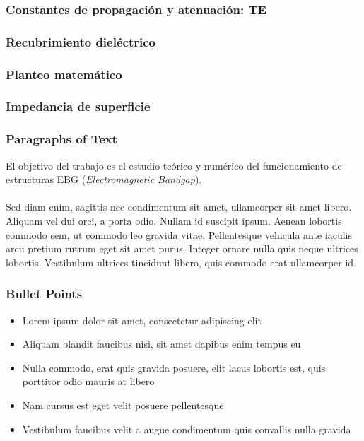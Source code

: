 \documentclass{beamer}
\begin{document}
			\begin{frame}
			\frametitle{Constantes de propagación y atenuación: TE}
			\end{frame}
		
		\subsubsection{Recubrimiento dieléctrico}
			
			\begin{frame}
			\frametitle{Planteo matemático}
			\end{frame}
			
			\begin{frame}
			\frametitle{Impedancia de superficie}
			\end{frame}
		

\begin{frame}
\frametitle{Paragraphs of Text}
El objetivo del trabajo es el estudio teórico y numérico del funcionamiento de estructuras EBG (\textit{Electromagnetic Bandgap}).\\~\\

Sed diam enim, sagittis nec condimentum sit amet, ullamcorper sit amet libero. Aliquam vel dui orci, a porta odio. Nullam id suscipit ipsum. Aenean lobortis commodo sem, ut commodo leo gravida vitae. Pellentesque vehicula ante iaculis arcu pretium rutrum eget sit amet purus. Integer ornare nulla quis neque ultrices lobortis. Vestibulum ultrices tincidunt libero, quis commodo erat ullamcorper id.
\end{frame}


\begin{frame}
\frametitle{Bullet Points}
\begin{itemize}
\item Lorem ipsum dolor sit amet, consectetur adipiscing elit
\item Aliquam blandit faucibus nisi, sit amet dapibus enim tempus eu
\item Nulla commodo, erat quis gravida posuere, elit lacus lobortis est, quis porttitor odio mauris at libero
\item Nam cursus est eget velit posuere pellentesque
\item Vestibulum faucibus velit a augue condimentum quis convallis nulla gravida
\end{itemize}
\end{frame}
\end{document}

